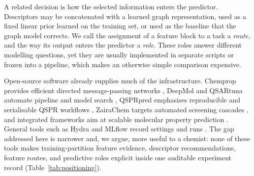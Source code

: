 A related decision is how the selected information enters the predictor. Descriptors may be concatenated with a learned graph representation, used as a fixed linear prior learned on the training set, or used as the baseline that the graph model corrects. We call the assignment of a feature block to a task a \emph{route}, and the way its output enters the predictor a \emph{role}. These roles answer different modelling questions, yet they are usually implemented in separate scripts or frozen into a pipeline, which makes an otherwise simple comparison expensive.

Open-source software already supplies much of the infrastructure. Chemprop provides efficient directed message-passing networks \cite{heid2024chemprop,graff2026chemprop}, DeepMol and QSARtuna automate pipeline and model search \cite{correia2024deepmol,mervin2024qsartuna,dixon2016autoqsar}, QSPRpred emphasises reproducible and serialisable QSPR workflows \cite{vandenmaagdenberg2024qsprpred}, ZairaChem targets automated screening cascades \cite{turon2023zairachem}, and integrated frameworks aim at scalable molecular property prediction \cite{chen2023integrated}. General tools such as Hydra and MLflow record settings and runs \cite{yadan2019hydra,zaharia2018mlflow}. The gap addressed here is narrower and, we argue, more useful to a chemist: none of these tools makes training-partition feature evidence, descriptor recommendations, feature routes, and predictive roles explicit inside one auditable experiment record (Table~\ref{tab:positioning}).

